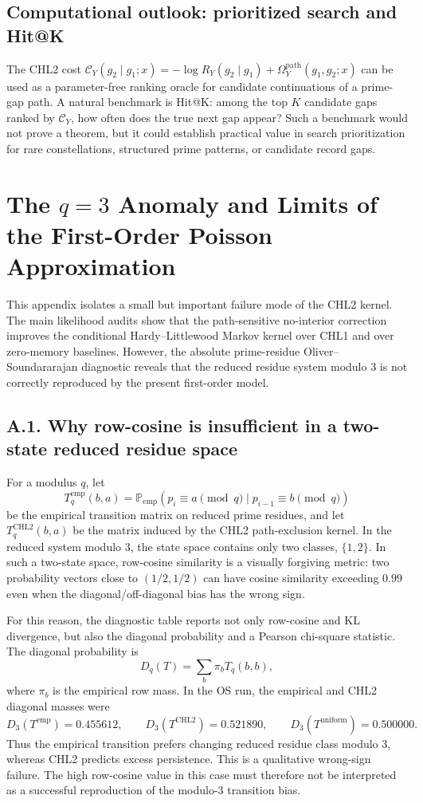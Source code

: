 \documentclass[10pt]{article}
\newcommand{\Omegapath}{\Omega_Y^{\mathrm{path}}}
\begin{document}
\subsection{Computational outlook: prioritized search and Hit@K}
The CHL2 cost $\mathcal C_Y(g_2\mid g_1;x)=-\log R_Y(g_2\mid g_1)+\Omegapath(g_1,g_2;x)$ can be used as a parameter-free ranking oracle for candidate continuations of a prime-gap path. A natural benchmark is Hit@K: among the top $K$ candidate gaps ranked by $\mathcal C_Y$, how often does the true next gap appear? Such a benchmark would not prove a theorem, but it could establish practical value in search prioritization for rare constellations, structured prime patterns, or candidate record gaps.
\appendix
\renewcommand{\thesection}{Appendix \Alph{section}:}
\section{The $q=3$ Anomaly and Limits of the First-Order Poisson Approximation}\label{app:q3}

This appendix isolates a small but important failure mode of the CHL2 kernel.  The main likelihood audits show that the path-sensitive no-interior correction improves the conditional Hardy--Littlewood Markov kernel over CHL1 and over zero-memory baselines.  However, the absolute prime-residue Oliver--Soundararajan diagnostic reveals that the reduced residue system modulo $3$ is not correctly reproduced by the present first-order model.

\subsection*{A.1. Why row-cosine is insufficient in a two-state reduced residue space}

For a modulus $q$, let
\[
T_q^{\mathrm{emp}}(b,a)=\mathbb{P}_{\mathrm{emp}}(p_i\equiv a\pmod q\mid p_{i-1}\equiv b\pmod q)
\]
be the empirical transition matrix on reduced prime residues, and let $T_q^{\mathrm{CHL2}}(b,a)$ be the matrix induced by the CHL2 path-exclusion kernel.  In the reduced system modulo $3$, the state space contains only two classes, $\{1,2\}$.  In such a two-state space, row-cosine similarity is a visually forgiving metric: two probability vectors close to $(1/2,1/2)$ can have cosine similarity exceeding $0.99$ even when the diagonal/off-diagonal bias has the wrong sign.

For this reason, the diagnostic table reports not only row-cosine and KL divergence, but also the diagonal probability and a Pearson chi-square statistic.  The diagonal probability is
\[
D_q(T)=\sum_b \pi_b T_q(b,b),
\]
where $\pi_b$ is the empirical row mass.  In the OS run, the empirical and CHL2 diagonal masses were
\[
D_3(T^{\mathrm{emp}})=0.455612,
\qquad
D_3(T^{\mathrm{CHL2}})=0.521890,
\qquad
D_3(T^{\mathrm{uniform}})=0.500000.
\]
Thus the empirical transition prefers changing reduced residue class modulo $3$, whereas CHL2 predicts excess persistence.  This is a qualitative wrong-sign failure.  The high row-cosine value in this case must therefore not be interpreted as a successful reproduction of the modulo-$3$ transition bias.
\end{document}
